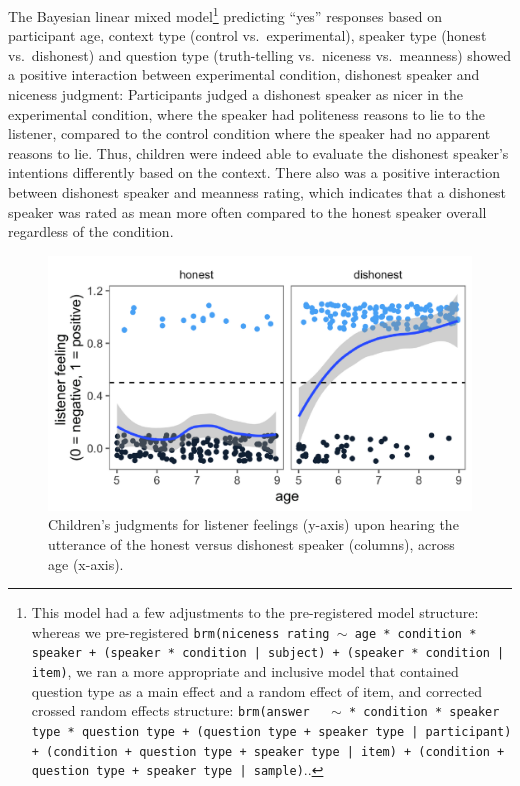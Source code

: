 \documentclass[oneside]{report}
\begin{document}
The Bayesian linear mixed model\footnote{This model had a few
  adjustments to the pre-registered model structure: whereas we
  pre-registered
  \texttt{brm(niceness rating $\sim$ age * condition * speaker + (speaker * condition | subject) + (speaker * condition | item)},
  we ran a more appropriate and inclusive model that contained question
  type as a main effect and a random effect of item, and corrected
  crossed random effects structure:
  \texttt{brm(answer ~ $\sim$ * condition * speaker type  * question type + (question type + speaker type | participant) + (condition + question type + speaker type | item) + (condition + question type + speaker type | sample)}..}
predicting ``yes'' responses based on participant age, context type
(control vs.~experimental), speaker type (honest vs.~dishonest) and
question type (truth-telling vs.~niceness vs.~meanness) showed a
positive interaction between experimental condition, dishonest speaker
and niceness judgment: Participants judged a dishonest speaker as nicer
in the experimental condition, where the speaker had politeness reasons
to lie to the listener, compared to the control condition where the
speaker had no apparent reasons to lie. Thus, children were indeed able
to evaluate the dishonest speaker's intentions differently based on the
context. There also was a positive interaction between dishonest speaker
and meanness rating, which indicates that a dishonest speaker was rated
as mean more often compared to the honest speaker overall regardless of
the condition.
\begin{figure}[t]

{\centering \includegraphics[width=0.9\linewidth]{erica_yoon_dissertation_files/figure-latex/figTrupolLfeelResultsPlacement-1} 

}

\caption[Listener feeling judgments in the experiment in Chapter 3.]{Children's judgments for listener feelings (y-axis) upon hearing the utterance of the honest versus dishonest speaker (columns), across age (x-axis).}\label{fig:figTrupolLfeelResultsPlacement}
\end{figure}
\end{document}
